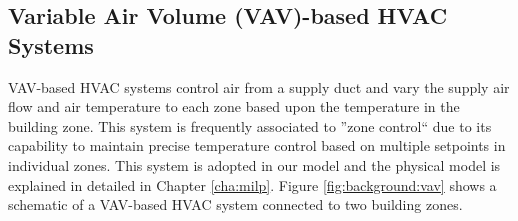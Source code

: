 

\subsection{Variable Air Volume (VAV)-based HVAC Systems}

VAV-based HVAC systems \citep{ashrae2016sys} control air from a supply duct and vary the supply air flow and air temperature to each zone based upon the temperature in the building zone. This system is frequently associated to ''zone control`` due to its capability to maintain precise temperature control based on multiple setpoints in individual zones. %
This system is adopted in our model and the physical model is explained in detailed in Chapter \ref{cha:milp}.
Figure \ref{fig:background:vav} shows a schematic of a VAV-based HVAC system connected to two building zones. 


